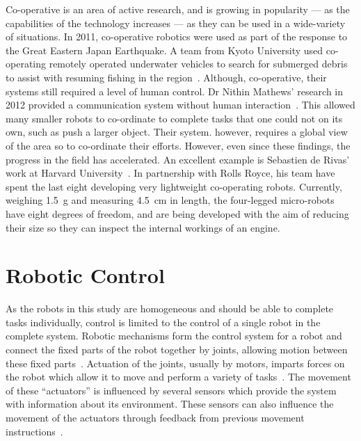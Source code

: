 Co-operative is an area of active research, and is growing in popularity --- as the
capabilities of the technology increases --- as they can be used in a wide-variety of
situations. In 2011, co-operative robotics were used as part of the
response to the Great Eastern Japan Earthquake. A team from Kyoto University
used co-operating remotely operated underwater vehicles to search for submerged
debris to assist with resuming fishing in the region~\cite{matsuno2014utilization}.
Although, co-operative, their systems still required a level of human control.
Dr Nithin Mathews' research in 2012 provided a communication system without
human interaction~\cite{mathews2012spatially}. This allowed many smaller robots
to co-ordinate to complete tasks that one could not on its own, such as push a
larger object. Their system. however, requires a global view of the area so to 
co-ordinate their efforts. However, even since these findings, the progress
in the field has accelerated. An excellent example is Sebastien de Rivas' work at
Harvard University~\cite{rollsroyceSWARM}. In partnership with Rolls Royce, his
team have spent the last eight developing very lightweight co-operating robots.
Currently, weighing \SI{1.5}{\g} and measuring \SI{4.5}{\cm} in length, the
four-legged micro-robots have eight degrees of freedom, and are being developed with
the aim of reducing their size so they can inspect the internal workings of an engine.


\section{Robotic Control} \label{litreview/robotics/control}  
As the robots in this study are homogeneous and should be able to complete 
tasks individually, control is limited to the control of a single robot in the 
complete system. Robotic mechanisms form the control system for a robot and 
connect the fixed parts of the robot together by joints, allowing motion between 
these fixed parts~\cite{lynch2017modern}. Actuation of the joints, usually 
by motors, imparts forces on the robot which allow it to move and perform a 
variety of tasks~\cite{lynch2017modern}. The movement of these ``actuators'' 
is influenced by several sensors which provide the system with information 
about its environment. These sensors can also influence the movement of the 
actuators through feedback from previous movement instructions~\cite{lynch2017modern}.    

